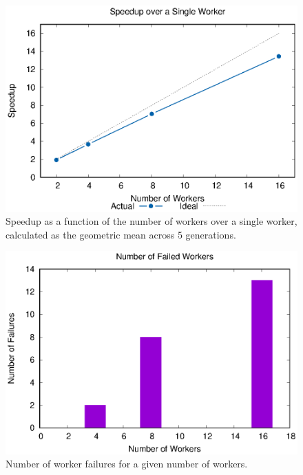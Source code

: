 \documentclass[conference]{IEEEtran}
\begin{document}
\begin{figure}
  \centering
  \includegraphics[width=\columnwidth]{result/output/rates}
  \caption{Speedup as a function of the number of workers over a single worker,
    calculated as the geometric mean across 5 generations.}
  \label{fig:scale}
\end{figure}

\begin{figure}
  \centering
  \includegraphics[width=\columnwidth]{result/output/failures}
  \caption{Number of worker failures for a given number of workers.}
  \label{fig:failures}
\end{figure}

\end{document}

